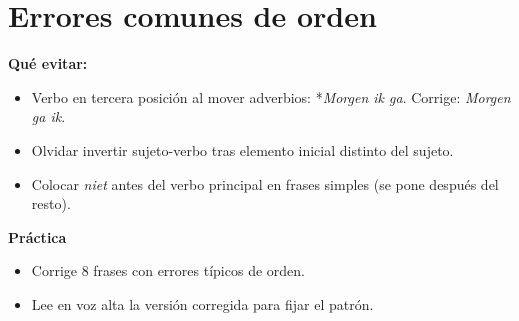 \section{Errores comunes de orden}
\textbf{Qué evitar:}
\begin{itemize}[leftmargin=*]
  \item Verbo en tercera posición al mover adverbios: *\textit{Morgen ik ga}. Corrige: \textit{Morgen ga ik}.
  \item Olvidar invertir sujeto-verbo tras elemento inicial distinto del sujeto.
  \item Colocar \textit{niet} antes del verbo principal en frases simples (se pone después del resto).
\end{itemize}

\textbf{Práctica}
\begin{itemize}[leftmargin=*]
  \item Corrige 8 frases con errores típicos de orden.
  \item Lee en voz alta la versión corregida para fijar el patrón.
\end{itemize}
